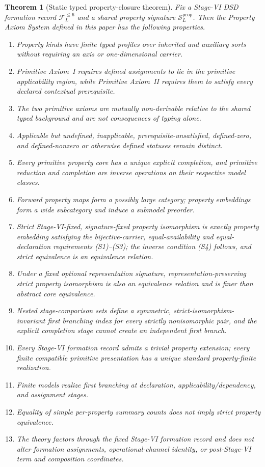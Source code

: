 \documentclass[11pt]{article}
\newcommand{\FVI}{\mathcal F_{L}^{\le 6}}
\newcommand{\Sprop}{\mathcal S_{L}^{\mathrm{prop}}}
\newtheorem{theorem}{Theorem}[section]
\theoremstyle{definition}
\theoremstyle{remark}
\begin{document}
\begin{theorem}[Static typed property-closure theorem]
\label{thm:main}
Fix a Stage-VI DSD formation record \(\FVI\) and a shared property signature \(\Sprop\).
Then the Property Axiom System defined in this paper has the following properties.
\begin{enumerate}[label=(\arabic*)]
\item Property kinds have finite typed profiles over inherited and auxiliary sorts without requiring an axis or one-dimensional carrier.
\item Primitive Axiom~I requires defined assignments to lie in the primitive applicability region, while Primitive Axiom~II requires them to satisfy every declared contextual prerequisite.
\item The two primitive axioms are mutually non-derivable relative to the shared typed background and are not consequences of typing alone.
\item Applicable but undefined, inapplicable, prerequisite-unsatisfied, defined-zero, and defined-nonzero or otherwise defined statuses remain distinct.
\item Every primitive property core has a unique explicit completion, and primitive reduction and completion are inverse operations on their respective model classes.
\item Forward property maps form a possibly large category; property embeddings form a wide subcategory and induce a submodel preorder.
\item Strict Stage-VI-fixed, signature-fixed property isomorphism is exactly property embedding satisfying the bijective-carrier, equal-availability and equal-declaration requirements (S1)--(S3); the inverse condition (S4) follows, and strict equivalence is an equivalence relation.
\item Under a fixed optional representation signature, representation-preserving strict property isomorphism is also an equivalence relation and is finer than abstract core equivalence.
\item Nested stage-comparison sets define a symmetric, strict-isomorphism-invariant first branching index for every strictly nonisomorphic pair, and the explicit completion stage cannot create an independent first branch.
\item Every Stage-VI formation record admits a trivial property extension; every finite compatible primitive presentation has a unique standard property-finite realization.
\item Finite models realize first branching at declaration, applicability/dependency, and assignment stages.
\item Equality of simple per-property summary counts does not imply strict property equivalence.
\item The theory factors through the fixed Stage-VI formation record and does not alter formation assignments, operational-channel identity, or post-Stage-VI term and composition coordinates.
\end{enumerate}
\end{theorem}
\end{document}
